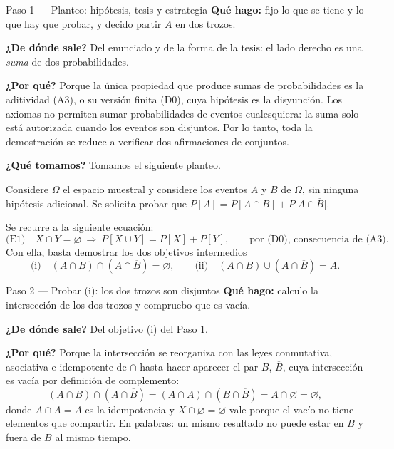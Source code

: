 \documentclass[11pt]{article}
\begin{document}
\begin{sol}

\begin{paso}{Paso 1 --- Planteo: hipótesis, tesis y estrategia}
\textbf{Qué hago:} fijo lo que se tiene y lo que hay que probar, y decido partir $A$ en dos
trozos.

\textbf{¿De dónde sale?} Del enunciado y de la forma de la tesis: el lado derecho es una
\emph{suma} de dos probabilidades.

\textbf{¿Por qué?} Porque la única propiedad que produce sumas de probabilidades es la
aditividad (A3), o su versión finita (D0), cuya hipótesis es la disyunción. Los axiomas no
permiten sumar probabilidades de eventos cualesquiera: la suma solo está autorizada cuando los
eventos son disjuntos. Por lo tanto, toda la demostración se reduce a verificar dos afirmaciones
de conjuntos.

\textbf{¿Qué tomamos?} Tomamos el siguiente planteo.

\medskip
Considere $\Omega$ el espacio muestral y considere los eventos $A$ y $B$ de $\Omega$, sin
ninguna hipótesis adicional. Se solicita probar que
$P[A]=P[A\cap B]+P\big[A\cap\overline{B}\big]$.

\medskip
Se recurre a la siguiente ecuación:
\[
\text{(E1)}\quad X\cap Y=\varnothing\ \Longrightarrow\ P[X\cup Y]=P[X]+P[Y],
\qquad\text{por (D0), consecuencia de (A3).}
\]
Con ella, basta demostrar los dos objetivos intermedios
\[
\text{(i)}\quad (A\cap B)\cap(A\cap\overline{B})=\varnothing,
\qquad
\text{(ii)}\quad (A\cap B)\cup(A\cap\overline{B})=A .
\]
\end{paso}

\begin{paso}{Paso 2 --- Probar (i): los dos trozos son disjuntos}
\textbf{Qué hago:} calculo la intersección de los dos trozos y compruebo que es vacía.

\textbf{¿De dónde sale?} Del objetivo (i) del Paso 1.

\textbf{¿Por qué?} Porque la intersección se reorganiza con las leyes conmutativa, asociativa e
idempotente de $\cap$ hasta hacer aparecer el par $B$, $\overline{B}$, cuya intersección es
vacía por definición de complemento:
\[
(A\cap B)\cap(A\cap\overline{B})
=(A\cap A)\cap(B\cap\overline{B})
=A\cap\varnothing
=\varnothing ,
\]
donde $A\cap A=A$ es la idempotencia y $X\cap\varnothing=\varnothing$ vale porque el vacío no
tiene elementos que compartir. En palabras: un mismo resultado no puede estar en $B$ y fuera de
$B$ al mismo tiempo.


\end{paso}
\end{sol}
\end{document}
